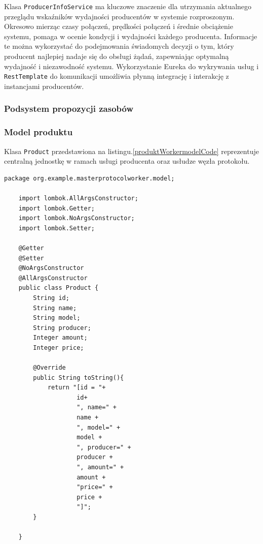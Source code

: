 Klasa \verb|ProducerInfoService| ma kluczowe znaczenie dla utrzymania aktualnego przeglądu wskaźników wydajności producentów w systemie rozproszonym. Okresowo mierząc czasy połączeń, prędkości połączeń i średnie obciążenie systemu, pomaga w ocenie kondycji i wydajności każdego producenta. Informacje te można wykorzystać do podejmowania świadomych decyzji o tym, który producent najlepiej nadaje się do obsługi żądań, zapewniając optymalną wydajność i niezawodność systemu. Wykorzystanie Eureka do wykrywania usług i \verb|RestTemplate| do komunikacji  umożliwia płynną integrację i interakcję z instancjami producentów.

\subsubsection{Podsystem propozycji zasobów}

\subsubsection{Model produktu}

Klasa \verb|Product| przedstawiona na listingu.\ref{produktWorkermodelCode} reprezentuje centralną jednostkę w ramach usługi producenta oraz usłudze węzła protokołu.

\begin{lstlisting}[caption=Klasa reprezentująca produkt, label=produktWorkermodelCode]
    package org.example.masterprotocolworker.model;
    
    import lombok.AllArgsConstructor;
    import lombok.Getter;
    import lombok.NoArgsConstructor;
    import lombok.Setter;
    
    @Getter
    @Setter
    @NoArgsConstructor
    @AllArgsConstructor
    public class Product {
        String id;
        String name;
        String model;
        String producer;
        Integer amount;
        Integer price;
    
        @Override
        public String toString(){
            return "[id = "+
                    id+
                    ", name=" +
                    name +
                    ", model=" +
                    model +
                    ", producer=" +
                    producer +
                    ", amount=" +
                    amount +
                    "price=" +
                    price +
                    "]";
        }
    
    }
\end{lstlisting}

